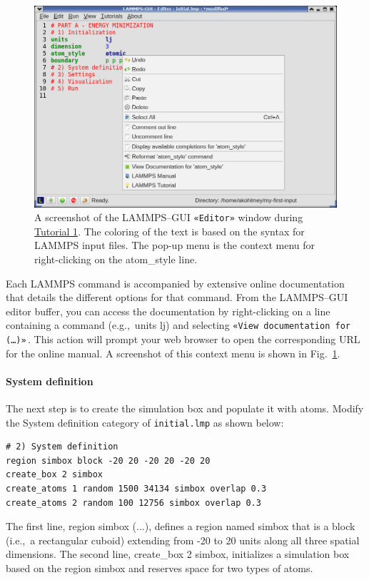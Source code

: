 \documentclass[9pt,tutorial]{livecoms}
\newcommand{\lmpcmd}[1]{\hspace{0pt}\colorbox{listing}{\textcolor{command}{\small{#1}}}\hspace{0pt}} %
\newcommand{\flecmd}[1]{\textcolor{command}{\texttt{#1}}} %
\newcommand{\guicmd}[1]{\textcolor{command}{\texttt{«#1»}}} %
\begin{document}
\begin{figure}
\centering
\includegraphics[width=\linewidth]{GUI-1.png}
\caption{A screenshot of the LAMMPS--GUI \guicmd{Editor} window during
  \hyperref[lennard-jones-label]{Tutorial 1}.  The coloring of the text
  is based on the syntax for LAMMPS input files.  The pop-up menu is the
  context menu for right-clicking on the \lmpcmd{atom\_style} line.}
\label{fig:GUI-1}
\end{figure}

Each LAMMPS command is accompanied by extensive online documentation
that details the different options for that command.  From the LAMMPS--GUI
editor buffer, you can access the documentation by
right-clicking on a line containing a command (e.g.,~\lmpcmd{units lj}) and
selecting \guicmd{View documentation for (\dots)}\,.  This action will
prompt your web browser to open the corresponding URL for the online manual.
A screenshot of this context menu is shown in Fig.~\ref{fig:GUI-1}.

\paragraph{System definition}

The next step is to create the simulation box and populate it with atoms.
Modify the \lmpcmd{System definition} category of \flecmd{initial.lmp} as shown below:
\begin{lstlisting}
# 2) System definition
region simbox block -20 20 -20 20 -20 20
create_box 2 simbox
create_atoms 1 random 1500 34134 simbox overlap 0.3
create_atoms 2 random 100 12756 simbox overlap 0.3
\end{lstlisting}
The first line, \lmpcmd{region simbox (...)}, defines a region
named \lmpcmd{simbox} that is a block (i.e.,~a rectangular
cuboid) extending from -20 to 20 units along all three spatial dimensions.
The second line, \lmpcmd{create\_box 2 simbox}, initializes a simulation box
based on the region \lmpcmd{simbox} and reserves space for two types of atoms.
\end{document}
